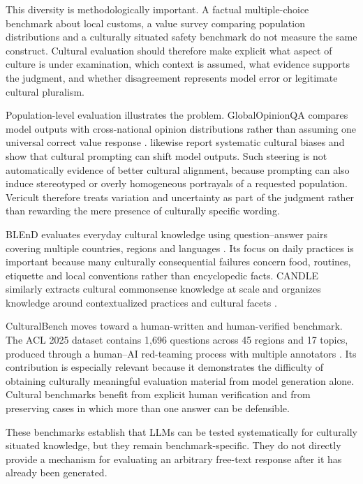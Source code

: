 This diversity is methodologically important. A factual multiple-choice benchmark about local customs, a value survey comparing population distributions and a culturally situated safety benchmark do not measure the same construct. Cultural evaluation should therefore make explicit what aspect of culture is under examination, which context is assumed, what evidence supports the judgment, and whether disagreement represents model error or legitimate cultural pluralism.

Population-level evaluation illustrates the problem. GlobalOpinionQA compares model outputs with cross-national opinion distributions rather than assuming one universal correct value response \parencite{durmus2023globalopinionqa}. \textcite{tao2024culturalbias} likewise report systematic cultural biases and show that cultural prompting can shift model outputs. Such steering is not automatically evidence of better cultural alignment, because prompting can also induce stereotyped or overly homogeneous portrayals of a requested population. Vericult therefore treats variation and uncertainty as part of the judgment rather than rewarding the mere presence of culturally specific wording.

BLEnD evaluates everyday cultural knowledge using question--answer pairs covering multiple countries, regions and languages \parencite{myung2024blend}. Its focus on daily practices is important because many culturally consequential failures concern food, routines, etiquette and local conventions rather than encyclopedic facts. CANDLE similarly extracts cultural commonsense knowledge at scale and organizes knowledge around contextualized practices and cultural facets \parencite{nguyen2023candle}.

CulturalBench moves toward a human-written and human-verified benchmark. The ACL 2025 dataset contains 1,696 questions across 45 regions and 17 topics, produced through a human--AI red-teaming process with multiple annotators \parencite{chiu2025culturalbench}. Its contribution is especially relevant because it demonstrates the difficulty of obtaining culturally meaningful evaluation material from model generation alone. Cultural benchmarks benefit from explicit human verification and from preserving cases in which more than one answer can be defensible.

These benchmarks establish that LLMs can be tested systematically for culturally situated knowledge, but they remain benchmark-specific. They do not directly provide a mechanism for evaluating an arbitrary free-text response after it has already been generated.

